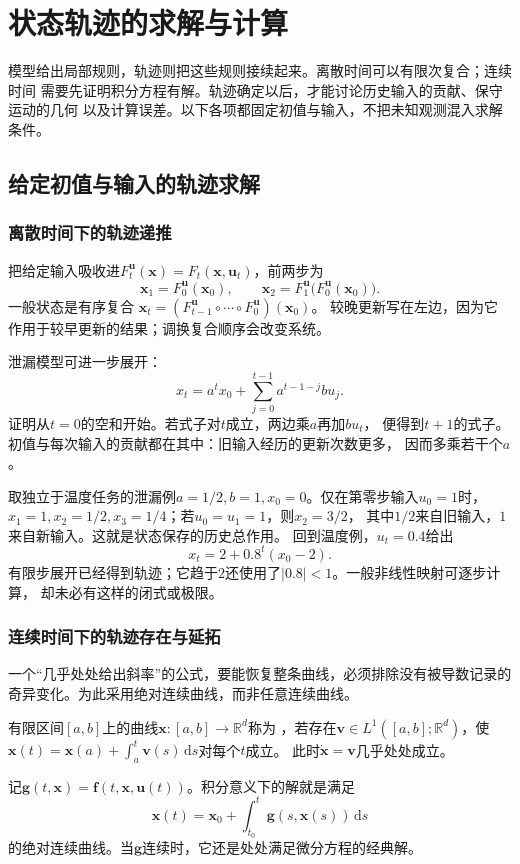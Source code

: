 \section{状态轨迹的求解与计算}
\label{sec:action-state-trajectory-computation}

模型给出局部规则，轨迹则把这些规则接续起来。离散时间可以有限次复合；连续时间
需要先证明积分方程有解。轨迹确定以后，才能讨论历史输入的贡献、保守运动的几何
以及计算误差。以下各项都固定初值与输入，不把未知观测混入求解条件。

\subsection{给定初值与输入的轨迹求解}

\subsubsection{离散时间下的轨迹递推}

把给定输入吸收进$F_t^{\bm u}(\bm x)=F_t(\bm x,\bm u_t)$，前两步为
\[
  \bm x_1=F_0^{\bm u}(\bm x_0),\qquad
  \bm x_2=F_1^{\bm u}\bigl(F_0^{\bm u}(\bm x_0)\bigr).
\]
一般状态是有序复合
$\bm x_t=(F_{t-1}^{\bm u}\circ\cdots\circ F_0^{\bm u})(\bm x_0)$。
较晚更新写在左边，因为它作用于较早更新的结果；调换复合顺序会改变系统。

泄漏模型可进一步展开：
\begin{equation}
  x_t=a^t x_0+\sum_{j=0}^{t-1}a^{t-1-j}b u_j.
  \label{eq:dynamical-discrete-variation-constants}
\end{equation}
证明从$t=0$的空和开始。若式子对$t$成立，两边乘$a$再加$b u_t$，
便得到$t+1$的式子。初值与每次输入的贡献都在其中：旧输入经历的更新次数更多，
因而多乘若干个$a$。

取独立于温度任务的泄漏例$a=1/2,b=1,x_0=0$。仅在第零步输入$u_0=1$时，
$x_1=1,x_2=1/2,x_3=1/4$；若$u_0=u_1=1$，则$x_2=3/2$，
其中$1/2$来自旧输入，$1$来自新输入。这就是状态保存的历史总作用。
回到温度例，$u_t=0.4$给出
\[
  x_t=2+0.8^t(x_0-2).
\]
有限步展开已经得到轨迹；它趋于$2$还使用了$|0.8|<1$。一般非线性映射可逐步计算，
却未必有这样的闭式或极限。

\subsubsection{连续时间下的轨迹存在与延拓}

一个“几乎处处给出斜率”的公式，要能恢复整条曲线，必须排除没有被导数记录的
奇异变化。为此采用绝对连续曲线，而非任意连续曲线。
\begin{definition}[绝对连续曲线]
  \label{def:dynamical-absolutely-continuous-curve}
  有限区间$[a,b]$上的曲线$\bm x:[a,b]\to\mathbb R^d$称为
  ，若存在$\bm v\in L^1([a,b];\mathbb R^d)$，使
  $\bm x(t)=\bm x(a)+\int_a^t\bm v(s)\,\mathrm ds$对每个$t$成立。
  此时$\dot{\bm x}=\bm v$几乎处处成立。
\end{definition}
记$\bm g(t,\bm x)=\bm f(t,\bm x,\bm u(t))$。积分意义下的解就是满足
\begin{equation}
  \bm x(t)=\bm x_0+\int_{t_0}^t\bm g(s,\bm x(s))\,\mathrm ds
  \label{eq:dynamical-ivp-integral-form}
\end{equation}
的绝对连续曲线。当$\bm g$连续时，它还是处处满足微分方程的经典解。

